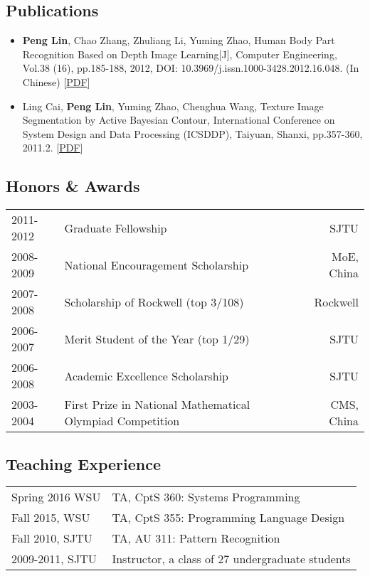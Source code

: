 \documentclass[10pt, a4paper]{article}
\begin{document}
\subsection*{Publications}
\label{sec-1-5}
\begin{itemize}
\item \textbf{Peng Lin}, Chao Zhang, Zhuliang Li, Yuming Zhao, Human Body Part
Recognition Based on Depth Image Learning[J], Computer Engineering, Vol.38
(16), pp.185-188, 2012, DOI: 10.3969/j.issn.1000-3428.2012.16.048. (In
Chinese) [\href{https://drive.google.com/viewerng/viewer?a=v&pid=sites&srcid=ZGVmYXVsdGRvbWFpbnxwZW5nbGluMDN8Z3g6MmZhYzU4NjM1NDlkMjg1Mw}{PDF}]
\item Ling Cai, \textbf{Peng Lin}, Yuming Zhao, Chenghua Wang, Texture Image
Segmentation by Active Bayesian Contour, International Conference on
System Design and Data Processing (ICSDDP), Taiyuan, Shanxi, pp.357-360,
2011.2. [\href{https://drive.google.com/viewerng/viewer?a=v&pid=sites&srcid=ZGVmYXVsdGRvbWFpbnxwZW5nbGluMDN8Z3g6NzYwYzEzZTViNGRmY2NjYg}{PDF}]
\end{itemize}

\subsection*{Honors \& Awards}
\label{sec-1-6}
\begin{center}
\begin{tabularx}{\linewidth}{lXr}
2011-2012 & Graduate Fellowship & SJTU\\
2008-2009 & National Encouragement Scholarship & MoE, China\\
2007-2008 & Scholarship of Rockwell (top 3/108) & Rockwell\\
2006-2007 & Merit Student of the Year (top 1/29) & SJTU\\
2006-2008 & Academic Excellence Scholarship & SJTU\\
2003-2004 & First Prize in National Mathematical Olympiad Competition & CMS, China\\
\end{tabularx}
\end{center}

\subsection*{Teaching Experience}
\label{sec-1-7}
\begin{center}
\begin{tabularx}{\linewidth}{lX}
Spring 2016 WSU & TA, CptS 360: Systems Programming\\
Fall 2015, WSU & TA, CptS 355: Programming Language Design\\
Fall 2010, SJTU & TA, AU 311: Pattern Recognition\\
2009-2011, SJTU & Instructor, a class of 27 undergraduate students\\
\end{tabularx}
\end{center}
\end{document}
